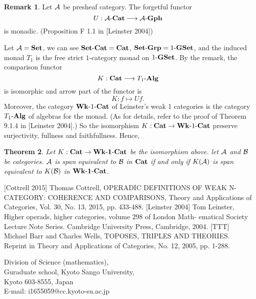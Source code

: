 \documentclass[12pt]{article}
\theoremstyle{plain}
\newtheorem{theorem}{Theorem}[section]
\theoremstyle{definition}
\newtheorem{remark}[theorem]{Remark}
\begin{document}
\begin{remark}
Let ${\cal A}$ be presheaf category. The forgetful functor
\[
U: {\cal A} \mathchar`- {\bf Cat} \longrightarrow {\cal A} \mathchar`- {\bf Gph}
\]
is monadic. (Proposition F 1.1 in [Leinster 2004])
\end{remark}

Let ${\cal A} = {\bf Set}$, we can see ${\bf Set} \mathchar`- {\bf Cat} = {\bf Cat}$, ${\bf Set} \mathchar`- {\bf Grp} = 1 \mathchar`- {\bf GSet}$, and the induced monad $T_1$ is the free strict $1$-category monad on $1 \mathchar`- {\bf GSet}$. By the remark, the comparison functor 
\[
K: {\bf Cat} \longrightarrow T_1 \mathchar`- {\bf Alg}
\]
is isomorphic and arrow part of the functor is
\[
K: f \longmapsto Uf .
\]
Moreover, the category ${\bf Wk} \mathchar`- 1 \mathchar`- {\bf Cat}$ of Leinster's weak 1 categories is the category $T_1 \mathchar`- {\bf Alg}$ of algebras for the monad. (As for details,  refer to the proof of Theorem 9.1.4 in [Leinster 2004].) 
So the isomorphism $K: {\bf Cat} \rightarrow {\bf Wk} \mathchar`- 1 \mathchar`- {\bf Cat}$ preserve surjectivity, fullness and faithfullness. Hence,

\begin{theorem}
Let $K: {\bf Cat} \rightarrow {\bf Wk \mathchar`- 1 \mathchar`- Cat}$ be the isomorphism above. let ${\cal A}$ and ${\cal B}$ be categories. ${\cal A}$ is span equivalent to ${\cal B}$ in ${\bf Cat}$ if and only if $K({\cal A})$ is span equivalent to $K({\cal B})$ in ${\bf Wk \mathchar`- 1 \mathchar`- Cat}$.
\end{theorem}



\begin{thebibliography}{99}
 [Cottrell 2015] Thomas Cottrell, OPERADIC DEFINITIONS OF WEAK N-CATEGORY: COHERENCE AND COMPARISONS, Theory and Applications of Categories, Vol. 30, No. 13, 2015, pp. 433-488.
 [Leinster 2004] Tom Leinster, Higher operads, higher categories, volume 298 of London Math-
ematical Society Lecture Note Series. Cambridge University Press, Cambridge, 2004.
 [TTT] Michael Barr and Charles Wells, TOPOSES, TRIPLES AND THEORIES. Reprint in Theory and Applications of Categories, No. 12, 2005, pp. 1-288.
\end{thebibliography}


\vspace{5mm}
\noindent
Division of Science (mathematics), \\
Guraduate school, Kyoto Sango University, \\
Kyoto 603-8555, Japan \\
E-mail: i1655059@cc.kyoto-su.ac.jp


\end{document}
